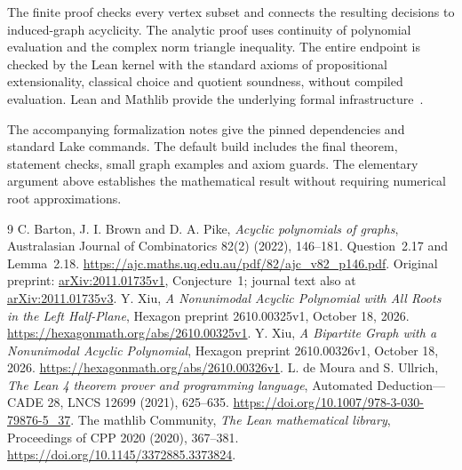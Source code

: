 \documentclass[11pt]{article}
\begin{document}
The finite proof checks every vertex subset and connects the resulting decisions to induced-graph acyclicity. The analytic proof uses continuity of polynomial evaluation and the complex norm triangle inequality. The entire endpoint is checked by the Lean kernel with the standard axioms of propositional extensionality, classical choice and quotient soundness, without compiled evaluation. Lean and Mathlib provide the underlying formal infrastructure~\cite{Lean,Mathlib}.

The accompanying formalization notes give the pinned dependencies and standard Lake commands. The default build includes the final theorem, statement checks, small graph examples and axiom guards. The elementary argument above establishes the mathematical result without requiring numerical root approximations.

\begin{thebibliography}{9}
C. Barton, J. I. Brown and D. A. Pike,
\emph{Acyclic polynomials of graphs}, Australasian Journal of Combinatorics
82(2) (2022), 146--181. Question~2.17 and Lemma~2.18.
\url{https://ajc.maths.uq.edu.au/pdf/82/ajc_v82_p146.pdf}.
Original preprint: \href{https://arxiv.org/abs/2011.01735v1}{arXiv:2011.01735v1}, Conjecture~1; journal text also at \href{https://arxiv.org/abs/2011.01735v3}{arXiv:2011.01735v3}.
Y. Xiu,
\emph{A Nonunimodal Acyclic Polynomial with All Roots in the Left Half-Plane},
Hexagon preprint 2610.00325v1, October 18, 2026.
\url{https://hexagonmath.org/abs/2610.00325v1}.
Y. Xiu,
\emph{A Bipartite Graph with a Nonunimodal Acyclic Polynomial},
Hexagon preprint 2610.00326v1, October 18, 2026.
\url{https://hexagonmath.org/abs/2610.00326v1}.
L. de Moura and S. Ullrich,
\emph{The Lean 4 theorem prover and programming language},
Automated Deduction---CADE 28, LNCS 12699 (2021), 625--635.
\url{https://doi.org/10.1007/978-3-030-79876-5_37}.
The mathlib Community,
\emph{The Lean mathematical library},
Proceedings of CPP 2020 (2020), 367--381.
\url{https://doi.org/10.1145/3372885.3373824}.
\end{thebibliography}
\end{document}
